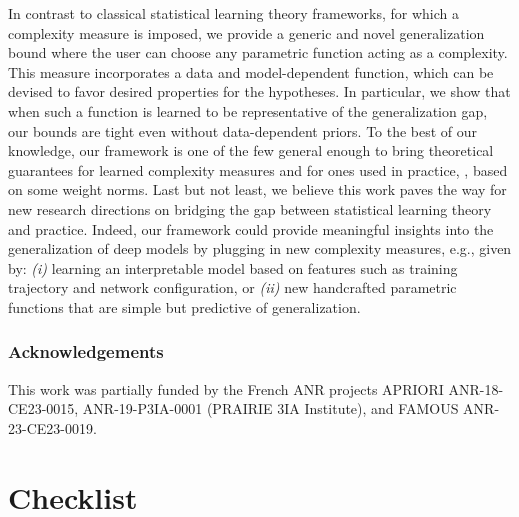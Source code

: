 \documentclass[twoside]{article}
\theoremstyle{plain}
\begin{document}
In contrast to classical statistical learning theory frameworks, for which a complexity measure is imposed, we provide a generic and novel generalization bound where the user can choose any parametric function acting as a complexity.
This measure incorporates a data and model-dependent function, which can be devised to favor desired properties for the hypotheses.
In particular, we show that when such a function is learned to be representative of the generalization gap, our bounds are tight even without data-dependent priors.
To the best of our knowledge, our framework is one of the few general enough to bring theoretical guarantees for learned complexity measures and for ones used in practice, 
\eg, based on some weight norms.
Last but not least, we believe this work paves the way for new research directions on bridging the gap between statistical learning theory and practice.
Indeed, our framework could provide meaningful insights into the generalization of deep models by plugging in new complexity measures, e.g., given by: {\it (i)} learning an interpretable model based on features such as training trajectory and network configuration, or {\it (ii)} new handcrafted parametric functions that are simple but predictive of generalization.

\subsubsection*{Acknowledgements}
This work was partially funded by the French ANR projects APRIORI ANR-18-CE23-0015, ANR-19-P3IA-0001 (PRAIRIE 3IA Institute), and FAMOUS ANR-23-CE23-0019.




\section*{Checklist}
\end{document}
